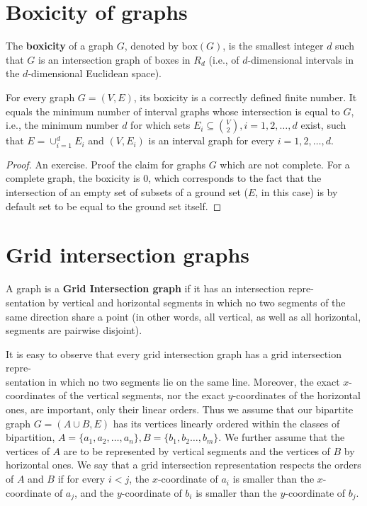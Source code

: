 \section{Boxicity of graphs}

\begin{defn}
	The \textbf{boxicity} of a graph $G$, denoted by $\text{box}(G)$, is the smallest integer $d$ such that $G$ is an intersection graph of boxes in $R_d$ (i.e., of $d$-dimensional intervals in the $d$-dimensional Euclidean space).
\end{defn}

\begin{prop}
For every graph $G = (V, E)$, its boxicity is a correctly defined finite number. It equals the minimum number of interval graphs whose intersection is equal to $G$, i.e., the minimum number $d$ for which sets $E_i \subseteq \binom{V}{2} , i = 1, 2, \dots, d$ exist, such that $E = \cup_{i=1}^d E_i$ and $(V, E_i)$ is an interval graph for every $i = 1, 2, \dots, d$.
\end{prop}

\begin{proof}
	An exercise. Proof the claim for graphs $G$ which are not complete. For a complete graph, the boxicity is $0$, which corresponds to the fact that the intersection of an empty set of subsets of a ground set ($E$, in this case) is by default set to be equal to the ground set itself.
\end{proof}

\section{Grid intersection graphs}

\begin{defn}
	A graph is a \textbf{Grid Intersection graph} if it has an intersection repre-\\sentation by vertical and horizontal segments in which no two segments of the same direction share a point (in other words, all vertical, as well as all horizontal, segments are pairwise disjoint).
\end{defn}

It is easy to observe that every grid intersection graph has a grid intersection repre-\\sentation in which no two segments lie on the same line. Moreover, the exact $x$-coordinates of the vertical segments, nor the exact $y$-coordinates of the horizontal ones, are important, only their linear orders. Thus we assume that our bipartite graph $G = (A \cup B, E)$ has its vertices linearly ordered within the classes of bipartition, $A = \{a_1 , a_2 , \dots, a_n\}, B = \{b_1 , b_2 \dots, b_m\}$. We further assume that the vertices of $A$ are to be represented by vertical segments and the vertices of $B$ by horizontal ones. We say that a grid intersection representation respects the orders of $A$ and $B$ if for every $i < j$, the $x$-coordinate of $a_i$ is smaller than the $x$-coordinate of $a_j$, and the $y$-coordinate of $b_i$ is smaller than the $y$-coordinate of $b_j$.


